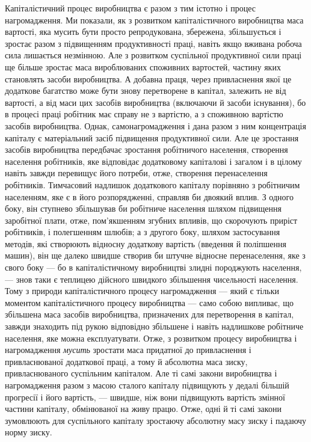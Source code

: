 Капіталістичний процес виробництва є разом з тим істотно і
процес нагромадження. Ми показали, як з розвитком капіталістичного
виробництва маса вартості, яка мусить бути просто
репродукована, збережена, збільшується і зростає разом з
підвищенням продуктивності праці, навіть якщо вживана робоча
сила лишається незмінною. Але з розвитком суспільної продуктивної
сили праці ще більше зростає маса вироблюваних споживних
вартостей, частину яких становлять засоби виробництва.
А добавна праця, через привласнення якої це додаткове багатство
може бути знову перетворене в капітал, залежить не від вартості,
а від маси цих засобів виробництва (включаючи й засоби
існування), бо в процесі праці робітник має справу не з вартістю,
а з споживною вартістю засобів виробництва. Однак, самонагромадження
і дана разом з ним концентрація капіталу є
матеріальний засіб підвищення продуктивної сили. Але це зростання
засобів виробництва передбачає зростання робітничого
населення, створення населення робітників, яке відповідає додатковому
капіталові і загалом і в цілому навіть завжди перевищує
його потреби, отже, створення перенаселення робітників.
Тимчасовий надлишок додаткового капіталу порівняно з робітничим
населенням, яке є в його розпорядженні, справляв би
двоякий вплив. З одного боку, він ступнево збільшував би робітниче
населення шляхом підвищення заробітної плати, отже,
пом’якшенням згубних впливів, що скорочують приріст робітників,
і полегшенням шлюбів; а з другого боку, шляхом застосування
методів, які створюють відносну додаткову вартість (введення
й поліпшення машин), він ще далеко швидше створив би
штучне відносне перенаселення, яке з свого боку — бо в капіталістичному
виробництві злидні породжують населення, — знов таки є
теплицею дійсного швидкого збільшення чисельності населення.
Тому з природи капіталістичного процесу нагромадження —
який є тільки моментом капіталістичного процесу виробництва —
само собою випливає, що збільшена маса засобів виробництва,
призначених для перетворення в капітал, завжди знаходить під
рукою відповідно збільшене і навіть надлишкове робітниче населення,
яке можна експлуатувати. Отже, з розвитком процесу
виробництва і нагромадження \emph{мусить} зростати маса придатної
до привласнення і привласнюваної додаткової праці, а тому й абсолютна
маса зиску, привласнюваного суспільним капіталом. Але ті
самі закони виробництва і нагромадження разом з масою сталого
капіталу підвищують у дедалі більшій прогресії і його вартість, —
швидше, ніж вони підвищують вартість змінної частини капіталу,
обмінюваної на живу працю. Отже, одні й ті самі закони зумовлюють
для суспільного капіталу зростаючу абсолютну масу
зиску і падаючу норму зиску.

